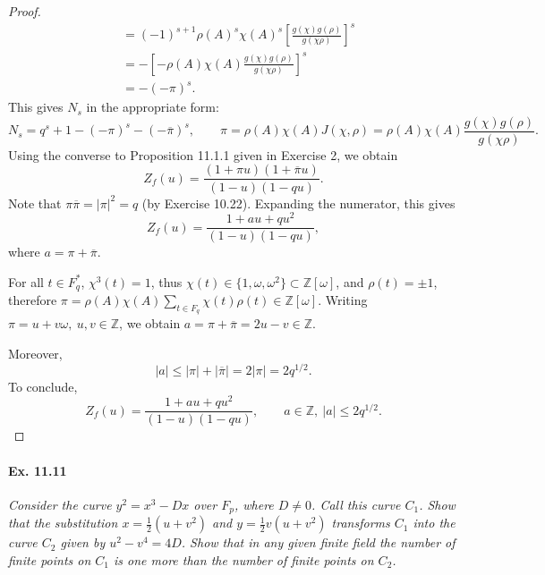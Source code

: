 \documentclass[11pt,a4paper]{article}
\newcommand{\Z}{\mathbb{Z}}
\begin{document}
\begin{proof}
\begin{align*}
&=(-1)^{s+1} \rho(A)^s \chi(A)^s \left[ \frac{g(\chi) g(\rho)}{g(\chi \rho)} \right]^s\\
&= - \left[ - \rho(A) \chi(A) \frac{g(\chi) g(\rho)}{g(\chi \rho)}\right]^s\\
&=-(-\pi)^s.
\end{align*}
This gives $N_s$ in the appropriate form:
$$N_s = q^s + 1- (-\pi)^s - (-\overline{\pi})^s, \qquad \pi = \rho(A) \chi(A) J(\chi,\rho) = \rho(A) \chi(A) \frac{g(\chi) g(\rho)}{g(\chi \rho)}.$$
Using the converse to Proposition 11.1.1 given in Exercise 2, we obtain
$$Z_f(u) =  \frac{(1 + \pi u)(1 + \overline{\pi} u)}{(1 -u)(1-qu)}.$$
Note that $\pi \overline{\pi}= |\pi|^2 = q$ (by Exercise 10.22). Expanding the numerator, this gives
$$Z_f(u) =  \frac{1 + au + qu^2}{(1 -u)(1-qu)},$$
where $a = \pi +\overline{\pi}$.

 For all $t \in F_q^*$,  $\chi^3(t) = 1$, thus $\chi(t) \in \{1,\omega, \omega^2\} \subset \Z[\omega]$, and $\rho(t) = \pm 1$, therefore $\pi = \rho(A) \chi(A) \sum_{t\in F_q} \chi(t) \rho(t) \in \Z[\omega]$. Writing $\pi = u + v \omega,\ u,v \in \Z$, we obtain $a = \pi + \overline{\pi} = 2u -v \in \Z$.
 
 Moreover,
 $$|a|  \leq |\pi| + |\overline{\pi}| = 2 |\pi|  = 2 q^{1/2}.$$
 To conclude,
 $$Z_f(u) =  \frac{1 + au + qu^2}{(1 -u)(1-qu)}, \qquad a \in \Z,\  |a| \leq  2 q^{1/2}.$$
\end{proof}


\paragraph{Ex. 11.11}{\it Consider the curve $y^2 = x^3 -Dx$ over $F_p$, where $D \ne 0$. Call this curve $C_1$. Show that the substitution $x = \frac{1}{2}(u+v^2)$ and $y = \frac{1}{2} v(u + v^2)$ transforms $C_1$ into the curve $C_2$ given by $u^2 - v^4 = 4D$. Show that in any given finite field the number of finite points on $C_1$ is one more than the number of finite points on $C_2$.
}
\end{document}
